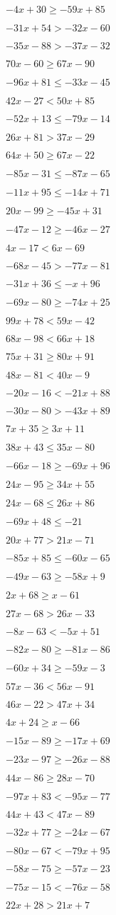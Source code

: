 \item $-4x+30 \geq -59x+85$
\item $-31x+54 > -32x-60$
\item $-35x-88 > -37x-32$
\item $70x-60 \geq 67x-90$
\item $-96x+81 \leq -33x-45$
\item $42x-27 < 50x+85$
\item $-52x+13 \leq -79x-14$
\item $26x+81 > 37x-29$
\item $64x+50 \geq 67x-22$
\item $-85x-31 \leq -87x-65$
\item $-11x+95 \leq -14x+71$
\item $20x-99 \geq -45x+31$
\item $-47x-12 \geq -46x-27$
\item $4x-17 < 6x-69$
\item $-68x-45 > -77x-81$
\item $-31x+36 \leq -x+96$
\item $-69x-80 \geq -74x+25$
\item $99x+78 < 59x-42$
\item $68x-98 < 66x+18$
\item $75x+31 \geq 80x+91$
\item $48x-81 < 40x-9$
\item $-20x-16 < -21x+88$
\item $-30x-80 > -43x+89$
\item $7x+35 \geq 3x+11$
\item $38x+43 \leq 35x-80$
\item $-66x-18 \geq -69x+96$
\item $24x-95 \geq 34x+55$
\item $24x-68 \leq 26x+86$
\item $-69x+48 \leq -21$
\item $20x+77 > 21x-71$
\item $-85x+85 \leq -60x-65$
\item $-49x-63 \geq -58x+9$
\item $2x+68 \geq x-61$
\item $27x-68 > 26x-33$
\item $-8x-63 < -5x+51$
\item $-82x-80 \geq -81x-86$
\item $-60x+34 \geq -59x-3$
\item $57x-36 < 56x-91$
\item $46x-22 > 47x+34$
\item $4x+24 \geq x-66$
\item $-15x-89 \geq -17x+69$
\item $-23x-97 \geq -26x-88$
\item $44x-86 \geq 28x-70$
\item $-97x+83 < -95x-77$
\item $44x+43 < 47x-89$
\item $-32x+77 \geq -24x-67$
\item $-80x-67 < -79x+95$
\item $-58x-75 \geq -57x-23$
\item $-75x-15 < -76x-58$
\item $22x+28 > 21x+7$


